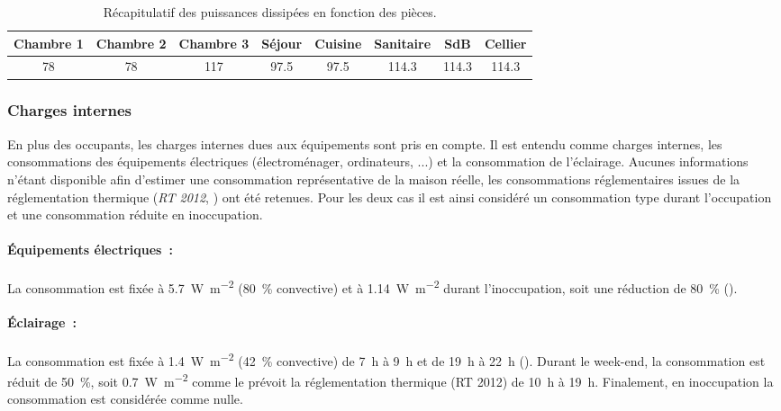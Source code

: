 
\begin{table}
\begin{tabular}{*8{c}}
    \toprule
    Chambre 1 & Chambre 2  & Chambre 3 & Séjour & Cuisine & Sanitaire & SdB   & Cellier \\
    \midrule
    78        & 78         & 117       & 97.5   & 97.5    & 114.3     & 114.3 & 114.3   \\
    \bottomrule
\end{tabular}
\caption{Récapitulatif des puissances dissipées en fonction des pièces.}
\label{tab:puissance_occupants}
\end{table}


\subsubsection{Charges internes} %
\label{ssub:charges_internes}
En plus des occupants, les charges internes dues aux équipements sont pris en compte.
Il est entendu comme charges internes, les consommations des équipements électriques
(électroménager, ordinateurs, ...) et la consommation de l’éclairage. Aucunes informations
n’étant disponible afin d’estimer une consommation représentative de la maison réelle,
les consommations réglementaires issues de la réglementation thermique (\emph{RT 2012}, \cite{CSTB2011})
ont été retenues. Pour les deux cas il est ainsi considéré un consommation type durant
l’occupation et une consommation réduite en inoccupation.

\paragraph{Équipements électriques~:} %
\label{par:equipements_electriques}
La consommation est fixée à \SI{5.7}{\watt\per m^{2}} (\SI{80}{\percent}
convective) et à \SI{1.14}{\watt\per m^{2}} durant l’inoccupation, soit une
réduction de \SI{80}{\percent} ().

\paragraph{Éclairage~:} %
\label{par:eclairage}
La consommation est fixée à \SI{1.4}{\watt\per m^{2}} (\SI{42}{\percent}
convective) de \SI{7}{\hour} à \SI{9}{\hour} et de \SI{19}{\hour} à \SI{22}{\hour}
(). Durant le week-end, la consommation est réduit de \SI{50}{\percent},
soit
\SI{0.7}{\watt\per m^{2}} comme le prévoit la réglementation thermique (RT 2012)
de \SI{10}{\hour} à \SI{19}{\hour}. Finalement, en inoccupation la consommation est
considérée comme nulle.

